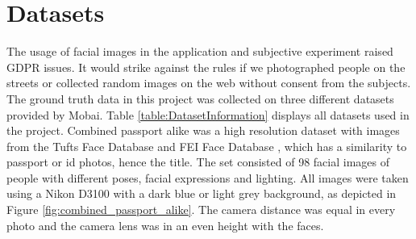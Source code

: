 \section{Datasets}
\label{sec:datasets}
The usage of facial images in the application and subjective experiment raised GDPR issues. It would strike against the rules if we photographed people on the streets or collected random images on the web without consent from the subjects. The ground truth data in this project was collected on three different datasets provided by Mobai. Table \ref{table:DatasetInformation} displays all datasets used in the project. Combined passport alike was a high resolution dataset with images from the Tufts Face Database \cite{Tufts-Face-Database} and FEI Face Database \cite{FEI-Face-Database}, which has a similarity to passport or id photos, hence the title. The set consisted of 98 facial images of people with different poses, facial expressions and lighting. All images were taken using a Nikon D3100 with a dark blue or light grey background, as depicted in Figure \ref{fig:combined_passport_alike}. The camera distance was equal in every photo and the camera lens was in an even height with the faces. 

